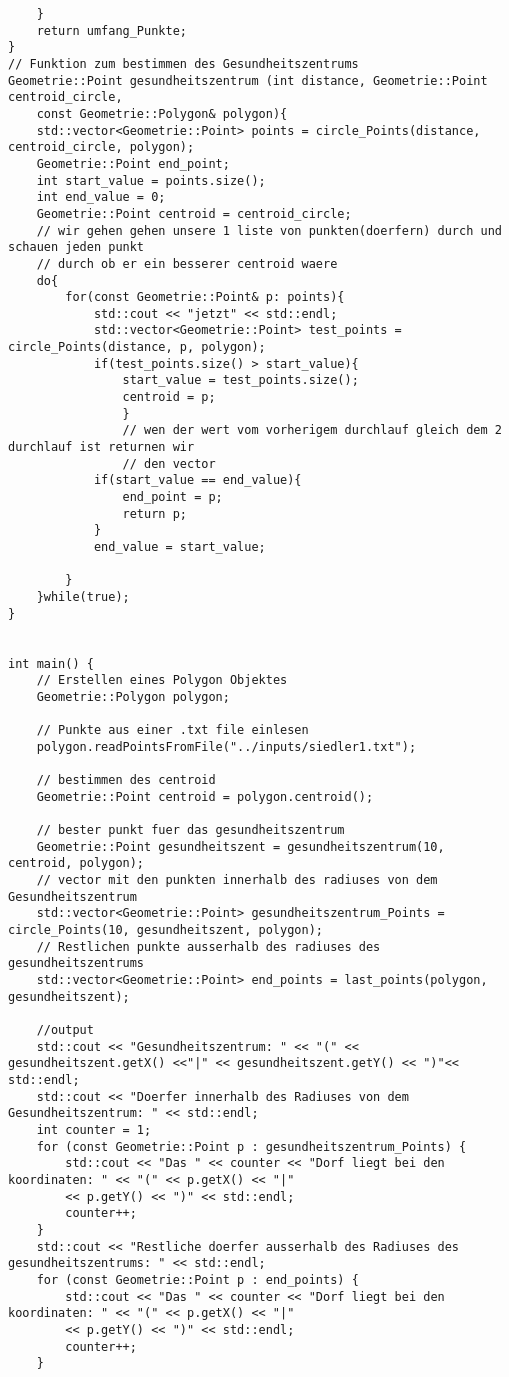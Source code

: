 \documentclass{article}
\begin{document}
\begin{verbatim}
	}
	return umfang_Punkte;
}
// Funktion zum bestimmen des Gesundheitszentrums
Geometrie::Point gesundheitszentrum (int distance, Geometrie::Point centroid_circle,
	const Geometrie::Polygon& polygon){
	std::vector<Geometrie::Point> points = circle_Points(distance, centroid_circle, polygon);
	Geometrie::Point end_point;
	int start_value = points.size();
	int end_value = 0;
	Geometrie::Point centroid = centroid_circle;
	// wir gehen gehen unsere 1 liste von punkten(doerfern) durch und schauen jeden punkt
	// durch ob er ein besserer centroid waere
	do{
		for(const Geometrie::Point& p: points){
			std::cout << "jetzt" << std::endl;
			std::vector<Geometrie::Point> test_points = circle_Points(distance, p, polygon);
			if(test_points.size() > start_value){
				start_value = test_points.size();
				centroid = p;
				}
				// wen der wert vom vorherigem durchlauf gleich dem 2 durchlauf ist returnen wir
				// den vector
			if(start_value == end_value){
				end_point = p;
				return p;
			}
			end_value = start_value;

		}
	}while(true);
}


int main() {
	// Erstellen eines Polygon Objektes
	Geometrie::Polygon polygon;

	// Punkte aus einer .txt file einlesen
	polygon.readPointsFromFile("../inputs/siedler1.txt");

	// bestimmen des centroid
	Geometrie::Point centroid = polygon.centroid();

	// bester punkt fuer das gesundheitszentrum
	Geometrie::Point gesundheitszent = gesundheitszentrum(10, centroid, polygon);
	// vector mit den punkten innerhalb des radiuses von dem Gesundheitszentrum
	std::vector<Geometrie::Point> gesundheitszentrum_Points = circle_Points(10, gesundheitszent, polygon);
	// Restlichen punkte ausserhalb des radiuses des gesundheitszentrums
	std::vector<Geometrie::Point> end_points = last_points(polygon, gesundheitszent);

	//output
	std::cout << "Gesundheitszentrum: " << "(" << gesundheitszent.getX() <<"|" << gesundheitszent.getY() << ")"<< std::endl;
	std::cout << "Doerfer innerhalb des Radiuses von dem Gesundheitszentrum: " << std::endl;
	int counter = 1;
	for (const Geometrie::Point p : gesundheitszentrum_Points) {
		std::cout << "Das " << counter << "Dorf liegt bei den koordinaten: " << "(" << p.getX() << "|"
		<< p.getY() << ")" << std::endl;
		counter++;
	}
	std::cout << "Restliche doerfer ausserhalb des Radiuses des gesundheitszentrums: " << std::endl;
	for (const Geometrie::Point p : end_points) {
		std::cout << "Das " << counter << "Dorf liegt bei den koordinaten: " << "(" << p.getX() << "|"
		<< p.getY() << ")" << std::endl;
		counter++;
	}




\end{verbatim}
\end{document}
